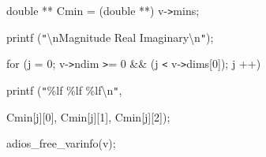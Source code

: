 double ** Cmin = (double **) v-\texttt{>}mins;

printf (\texttt{"}\textbackslash{}nMagnitude  Real  Imaginary\textbackslash{}n\texttt{"});

for (j = 0; v-\texttt{>}ndim \texttt{>}= 0 \&\&  (j \texttt{<} v-\texttt{>}dims[0]); 
j ++) 

printf (\texttt{"}\%lf \%lf \%lf\textbackslash{}n\texttt{"}, 

Cmin[j][0], Cmin[j][1], Cmin[j][2]);

adios\_free\_varinfo(v);\label{HToc82064268}\label{HToc82067516}\label{HToc84890309}\label{HToc212016684}\label{HToc212016926}\label{HToc82067538}\label{HToc182553452}
